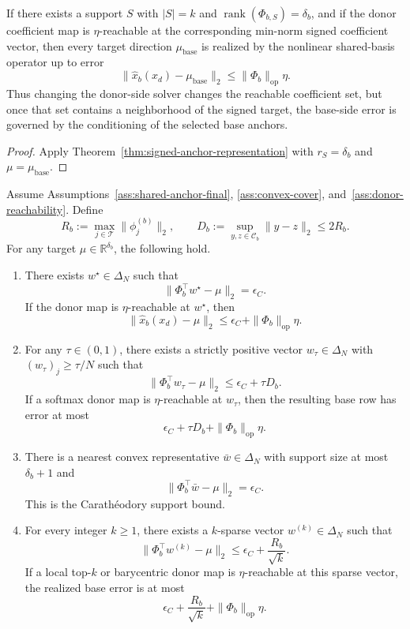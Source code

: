 \begin{corollary}
\label{cor:signed-support}
If there exists a support $S$ with $|S|=k$ and $\operatorname{rank}(\Phi_{b,S})=\delta_b$, and if the donor coefficient map is $\eta$-reachable at the corresponding min-norm signed coefficient vector, then every target direction $\mu_{\mathrm{base}}$ is realized by the nonlinear shared-basis operator up to error
\[
\|\widehat{x}_b(x_d)-\mu_{\mathrm{base}}\|_2
\le
\|\Phi_b\|_{\mathrm{op}}\eta.
\]
Thus changing the donor-side solver changes the reachable coefficient set, but once that set contains a neighborhood of the signed target, the base-side error is governed by the conditioning of the selected base anchors.
\end{corollary}

\begin{proof}
Apply Theorem~\ref{thm:signed-anchor-representation} with $r_S=\delta_b$ and $\mu=\mu_{\mathrm{base}}$.
\end{proof}

\begin{theorem}
\label{thm:convex-anchor-mixtures}
Assume Assumptions~\ref{ass:shared-anchor-final}, \ref{ass:convex-cover}, and~\ref{ass:donor-reachability}. Define
\[
R_b:=\max_{j\in\mathcal{T}}\|\phi_j^{(b)}\|_2,
\qquad
D_b:=\sup_{y,z\in\mathcal{C}_b}\|y-z\|_2\le 2R_b.
\]
For any target $\mu\in\mathbb{R}^{\delta_b}$, the following hold.
\begin{enumerate}[leftmargin=*]
\item There exists $w^\star\in\Delta_N$ such that
\[
\|\Phi_b^\top w^\star-\mu\|_2=\epsilon_C.
\]
If the donor map is $\eta$-reachable at $w^\star$, then
\[
\|\widehat{x}_b(x_d)-\mu\|_2
\le
\epsilon_C+
\|\Phi_b\|_{\mathrm{op}}\eta.
\]
\item For any $\tau\in(0,1)$, there exists a strictly positive vector $w_\tau\in\Delta_N$ with $(w_\tau)_j\ge \tau/N$ such that
\[
\|\Phi_b^\top w_\tau-\mu\|_2
\le
\epsilon_C+\tau D_b.
\]
If a softmax donor map is $\eta$-reachable at $w_\tau$, then the resulting base row has error at most
\[
\epsilon_C+\tau D_b+
\|\Phi_b\|_{\mathrm{op}}\eta.
\]
\item There is a nearest convex representative $\bar w\in\Delta_N$ with support size at most $\delta_b+1$ and
\[
\|\Phi_b^\top\bar w-\mu\|_2=\epsilon_C.
\]
This is the Carath\'eodory support bound.
\item For every integer $k\ge 1$, there exists a $k$-sparse vector $w^{(k)}\in\Delta_N$ such that
\[
\|\Phi_b^\top w^{(k)}-\mu\|_2
\le
\epsilon_C+\frac{R_b}{\sqrt{k}}.
\]
If a local top-$k$ or barycentric donor map is $\eta$-reachable at this sparse vector, the realized base error is at most
\[
\epsilon_C+\frac{R_b}{\sqrt{k}}+
\|\Phi_b\|_{\mathrm{op}}\eta.
\]
\end{enumerate}
\end{theorem}

